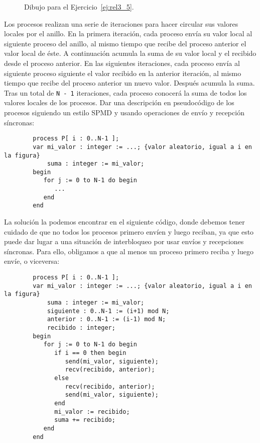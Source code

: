 \begin{ejercicio}
\begin{figure}[H]
\begin{multicols}{2}
        \end{multicols}
        \caption{Dibujo para el Ejercicio~\ref{ej:rel3_5}.}
        \label{fig:fig_ej_5}
    \end{figure}
    Los procesos realizan una serie de iteraciones para hacer circular sus valores locales por el anillo. En la primera iteración, cada proceso envía su valor local al siguiente proceso del anillo, al mismo tiempo que recibe del proceso anterior el valor local de éste. A continuación acumula la suma de su valor local y el recibido desde el proceso anterior. En las siguientes iteraciones, cada proceso envía al siguiente proceso siguiente el valor recibido en la anterior iteración, al mismo tiempo que recibe del proceso anterior un nuevo valor. Después acumula la suma. Tras un total de \verb|N - 1| iteraciones, cada proceso conocerá la suma de todos los valores locales de los procesos. Dar una descripción en pseudocódigo de los procesos siguiendo un estilo SPMD y usando operaciones de envío y recepción síncronas:
    \begin{verbatim}
        process P[ i : 0..N-1 ];
        var mi_valor : integer := ...; {valor aleatorio, igual a i en la figura}
            suma : integer := mi_valor;
        begin
           for j := 0 to N-1 do begin
              ...
           end
        end
    \end{verbatim}
    La solución la podemos encontrar en el siguiente código, donde debemos tener cuidado de que no todos los procesos primero envíen y luego reciban, ya que esto puede dar lugar a una situación de interbloqueo por usar envíos y recepciones síncronas. Para ello, obligamos a que al menos un proceso primero reciba y luego envíe, o viceversa:
    \begin{verbatim}
        process P[ i : 0..N-1 ];
        var mi_valor : integer := ...; {valor aleatorio, igual a i en la figura}
            suma : integer := mi_valor;
            siguiente : 0..N-1 := (i+1) mod N;
            anterior : 0..N-1 := (i-1) mod N;
            recibido : integer;
        begin
           for j := 0 to N-1 do begin
              if i == 0 then begin
                 send(mi_valor, siguiente);
                 recv(recibido, anterior);
              else
                 recv(recibido, anterior);
                 send(mi_valor, siguiente);
              end
              mi_valor := recibido;
              suma += recibido;
           end
        end
    \end{verbatim}
\end{ejercicio}

